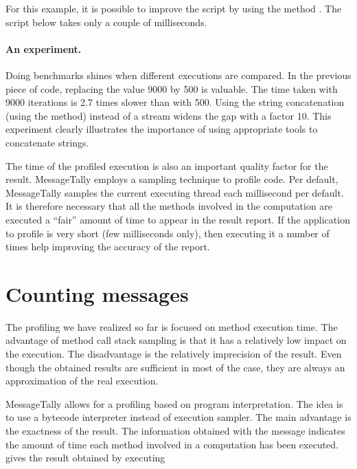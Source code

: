 \documentclass[a4paper,10pt,twoside]{book}
\begin{document}
For this example, it is possible to improve the script by using the method . The script below takes only a couple of milliseconds.
 

\paragraph{An experiment.}
Doing benchmarks shines when different executions are compared. In the previous piece of code, replacing the value 9000 by 500 is  valuable. The time taken with 9000 iterations is 2.7  times slower than with 500. Using the string concatenation (\ie using the \ct{,} method) instead of a stream widens the gap with a factor 10. This experiment clearly illustrates the importance of using appropriate tools to concatenate strings.

The time of the profiled execution is also an important quality factor for the result. MessageTally employs a sampling technique to profile code. Per default, MessageTally samples the current executing thread each millisecond per default. It is therefore necessary that all the methods involved in the computation are executed a ``fair'' amount of time to appear in the result report. If the application to profile is very short (few milliseconds only), then executing it a  number of times help improving the accuracy of the report. 



\section{Counting messages}
The profiling we have realized so far is focused on method execution time. The advantage of method call stack sampling is that it has a relatively low impact on the execution. The disadvantage is the relatively imprecision of the result. Even though the obtained results are sufficient in most of the case, they are always an approximation of the real execution.

MessageTally allows for a profiling based on program interpretation. The idea is to use a bytecode interpreter instead of execution sampler. The main advantage is the exactness of the result. The information obtained with the message  indicates the amount of time each method involved in a computation has been executed.  gives the result obtained by executing 
\end{document}
